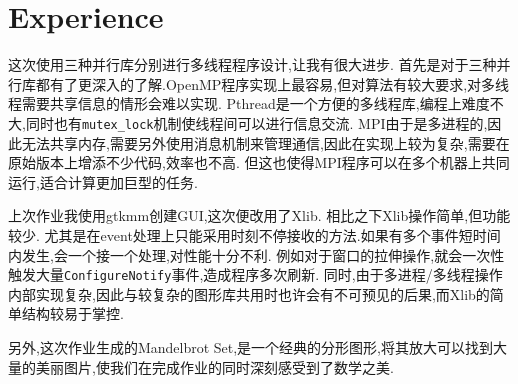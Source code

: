 \section{Experience}
	这次使用三种并行库分别进行多线程程序设计,让我有很大进步.
	首先是对于三种并行库都有了更深入的了解.OpenMP程序实现上最容易,但对算法有较大要求,对多线程需要共享信息的情形会难以实现.
Pthread是一个方便的多线程库,编程上难度不大,同时也有\verb|mutex_lock|机制使线程间可以进行信息交流.
MPI由于是多进程的,因此无法共享内存,需要另外使用消息机制来管理通信,因此在实现上较为复杂,需要在原始版本上增添不少代码,效率也不高.
但这也使得MPI程序可以在多个机器上共同运行,适合计算更加巨型的任务.

	上次作业我使用gtkmm创建GUI,这次便改用了Xlib. 相比之下Xlib操作简单,但功能较少.
	尤其是在event处理上只能采用时刻不停接收的方法.如果有多个事件短时间内发生,会一个接一个处理,对性能十分不利.
	例如对于窗口的拉伸操作,就会一次性触发大量\verb|ConfigureNotify|事件,造成程序多次刷新.
	同时,由于多进程/多线程操作内部实现复杂,因此与较复杂的图形库共用时也许会有不可预见的后果,而Xlib的简单结构较易于掌控.

	另外,这次作业生成的Mandelbrot Set,是一个经典的分形图形,将其放大可以找到大量的美丽图片,使我们在完成作业的同时深刻感受到了数学之美.
	
